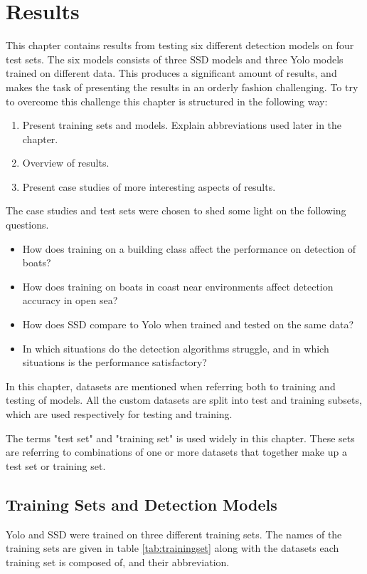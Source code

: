 \chapter{Results}
\label{sec:results}

This chapter contains results from testing six different detection models on four test sets. The six models consists of three SSD models and three Yolo models trained on different data. This produces a significant amount of results, and makes the task of presenting the results in an orderly fashion challenging. To try to overcome this challenge this chapter is structured in the following way:

\begin{enumerate}
    \item Present training sets and models. Explain abbreviations used later in the chapter.
    \item Overview of results.
    \item Present case studies of more interesting aspects of results.
\end{enumerate}

\noindent
The case studies  and test sets were chosen to shed some light on the following questions.

\begin{itemize}
    \item How does training on a building class affect the performance on detection of boats?
    \item How does training on boats in coast near environments affect detection accuracy in open sea?
    \item How does SSD compare to Yolo when trained and tested on the same data?
    \item In which situations do the detection algorithms struggle, and in which situations is the performance satisfactory?
\end{itemize}

\noindent
In this chapter, datasets are mentioned when referring both to training and testing of models. All the custom datasets are split into test and training subsets, which are used respectively for testing and training. 

\noindent
The terms "test set" and "training set" is used widely in this chapter. These sets are referring to combinations of one or more datasets that together make up a test set or training set.

\section{Training Sets and Detection Models}
Yolo and SSD were trained on three different training sets. The names of the training sets are given in table \ref{tab:trainingset} along with the datasets each training set is composed of, and their abbreviation.

